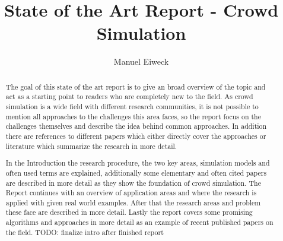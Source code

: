 \documentclass[sigconf]{acmart}
\begin{document}
\title{State of the Art Report - Crowd Simulation}

\author{Manuel Eiweck}


\renewcommand{\shortauthors}{Manuel Eiweck}

\begin{abstract}
The goal of this state of the art report is to give an broad overview of the topic and act as a starting point to readers who are completely new to the field. As crowd simulation is a wide field with different research communities, it is not possible to mention all approaches to the challenges this area faces, so the report focus on the challenges themselves and describe the idea behind common approaches. In addition there are references to different papers which either directly cover the approaches or literature which summarize the research in more detail.

In the Introduction the research procedure, the two key areas, simulation models and often used terms are explained, additionally some elementary and often cited papers are described in more detail as they show the foundation of crowd simulation. The Report continues with an overview of application areas and where the research is applied with given real world examples. After that the research areas and problem these face are described in more detail. Lastly the report covers some promising algorithms and approaches in more detail as an example of recent published papers on the field. 
TODO: finalize intro after finished report
\end{abstract}
\end{document}
